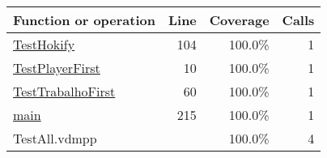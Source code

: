 \bigskip
\begin{longtable}{|l|r|r|r|}
\hline
Function or operation & Line & Coverage & Calls \\
\hline
\hline
\hyperref[TestHokify:104]{TestHokify} & 104&100.0\% & 1 \\
\hline
\hyperref[TestPlayerFirst:10]{TestPlayerFirst} & 10&100.0\% & 1 \\
\hline
\hyperref[TestTrabalhoFirst:60]{TestTrabalhoFirst} & 60&100.0\% & 1 \\
\hline
\hyperref[main:215]{main} & 215&100.0\% & 1 \\
\hline
\hline
TestAll.vdmpp & & 100.0\% & 4 \\
\hline
\end{longtable}

